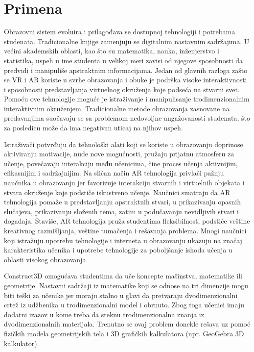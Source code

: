 \documentclass[a4paper]{article}
\begin{document}
	\section{Primena}
	\label{sec:Primena}
	Obrazovni sistem evoluira i prilagođava se dostupnoj tehnologiji i potrebama studenata. Tradicionalne knjige zamenjuju se digitalnim nastavnim sadržajima. 
	U većini akademskih oblasti, kao što su matematika, nauka, inženjerstvo i statistika, uspeh u ime studenta u velikoj meri zavisi od njegove sposobnosti da 
	predvidi i manipuliše apstraktnim informacijama. Jedan od glavnih razloga zašto se VR i AR koriste u svrhe obrazovanja i obuke je podrška visoke interaktivnosti 
	i sposobnosti predstavljanja virtuelnog okruženja koje podseća na stvarni svet. Pomoću ove tehnologije moguće je istraživanje i manipulisanje trodimenzionalnim 
	interaktivnim okruženjem. Tradicionalne metode obrazovanja zasnovane na predavanjima suočavaju se sa problemom nedovoljne  angažovanosti studenata, što za posledicu 
	može da ima negativan uticaj na njihov uspeh.


	Istraživači potvrđuju da tehnološki alati koji se koriste u obrazovanju doprinose aktiviranju motivacije, nude nove mogućnosti, pružaju prijatnu atmosferu za učenje, 
	povećavaju interakciju među učenicima, čine proces učenja aktivnijim, efikasnijim i sadržajnijim. Na sličan način AR tehnologija privlači pažnju naučnika u obrazovanju 
	jer favorizuje interakciju stvarnih i virtuelnih objekata i stvara okruženje koje podstiče iskustveno učenje. Naučnici smatraju da AR tehnologija pomaže u predstavljanju 
	apstraktnih stvari, u prikazivanju opasnih slučajeva, prikazivanju složenih tema, zatim u podučavanju nevidljivih stvari i događaja. Štaviše, AR tehnologija pruža studentima 
	fleksibilnost, podstiče veštine kreativnog razmišljanja, veštine tumačenja i rešavanja problema. Mnogi naučnici koji istražuju upotrebu tehnologije i interneta u obrazovanju 
	ukazuju na značaj karakteristika učenika i upotrebe tehnologije za poboljšanje ishoda učenja u oblasti visokog obrazovanja.

	Construct3D omogućava studentima da uče koncepte mašinstva, matematike ili geometrije. Nastavni sadržaji iz matematike koji se odnose na tri dimenzije mogu biti teški za učenike 
	jer moraju stalno u glavi da pretvaraju dvodimenzionalni crtež iz udžbenika u trodimenzionalni model i obrnuto. Zbog toga učenici imaju dodatni izazov u kome treba da steknu 
	trodimenzionalna znanja iz dvodimenzionalnih materijala. Trenutno se ovaj problem donekle rešava uz pomoć fizičkih modela geometrijskih tela i 3D grafičkih kalkulatora (npr. GeoGebra 3D kalkulator).
	
\end{document}
